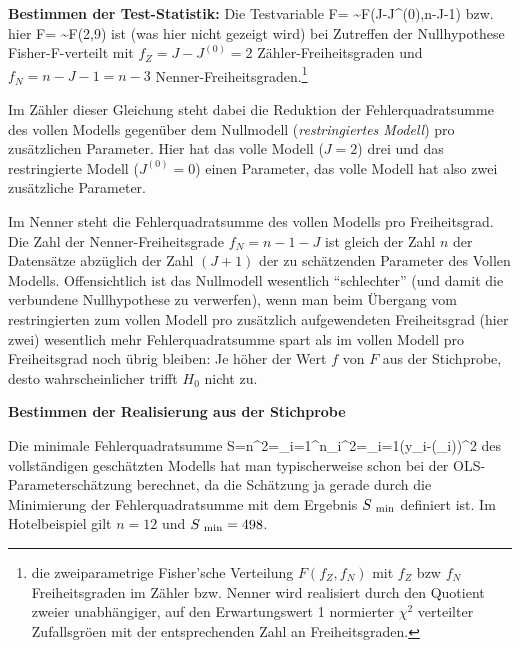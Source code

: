 \item \textbf{Bestimmen der Test-Statistik:} Die Testvariable
\be
\label{Fisher}
F= \sim F(J-J^{(0)},n-J-1)
\ee
bzw. hier
\be
F= \sim F(2,9)
\ee
ist (was hier nicht gezeigt wird) bei Zutreffen der Nullhypothese
Fisher-F-verteilt mit $f_Z=J-J^{(0)}=2$ Z\"ahler-Freiheitsgraden und $f_N=n-J-1=n-3$
Nenner-Freiheitsgraden.\footnote{die zweiparametrige Fisher'sche Verteilung
$F(f_Z,f_N)$ mit $f_Z$ bzw $f_N$ Freiheitsgraden im Z\"ahler
bzw. Nenner wird realisiert durch den Quotient zweier unabh\"angiger, auf den
Erwartungswert 1 normierter $\chi^2$ verteilter Zufallsgr\"o\3en mit
der entsprechenden Zahl an Freiheitsgraden.}
\bi
\item Im Z\"ahler dieser Gleichung steht dabei die Reduktion
der Fehlerquadratsumme des vollen Modells gegen\"uber dem Nullmodell
(\emph{restringiertes Modell})
pro zus\"atzlichen Parameter. Hier hat das volle Modell ($J=2$) drei und das
restringierte Modell ($J^{(0)}=0$) einen Parameter, das volle Modell hat also zwei
zus\"atzliche Parameter.
\item Im Nenner steht die Fehlerquadratsumme des vollen Modells pro
Freiheitsgrad. Die Zahl der Nenner-Freiheitsgrade $f_N=n-1-J$ ist gleich der
Zahl $n$ der Datens\"atze abz\"uglich der Zahl $(J+1)$ der zu
sch\"atzenden Parameter des Vollen Modells.
\ei
Offensichtlich ist das Nullmodell wesentlich ``schlechter'' (und damit
die verbundene Nullhypothese zu verwerfen), wenn man beim \"Ubergang
vom restringierten zum vollen Modell pro
zus\"atzlich aufgewendeten Freiheitsgrad (hier zwei) wesentlich mehr
Fehlerquadratsumme spart als im vollen Modell pro Freiheitsgrad noch
\"ubrig bleiben: Je h\"oher der Wert $f$ von $F$ aus der Stichprobe,
desto wahrscheinlicher trifft $H_0$ nicht zu.

\item \textbf{Bestimmen der Realisierung aus der Stichprobe}

Die minimale Fehlerquadratsumme 
\bdm
S=n\hatsigeps^2=\sum_{i=1}^n\epsilon_i^2=\sum_{i=1}(y_i-(_i))^2
\edm
des vollst\"andigen gesch\"atzten Modells hat man typischerweise schon
bei der OLS-Parametersch\"atzung berechnet, da die Sch\"atzung  ja gerade
durch die Minimierung der Fehlerquadratsumme mit dem Ergebnis
$S_{{\mbox{ {\scriptsize \hspace{-0.0ex}min}}}}$ definiert ist. Im  Hotelbeispiel  gilt $n=12$ und $S_{{\mbox{ {\scriptsize \hspace{-0.0ex}min}}}}=498$.


